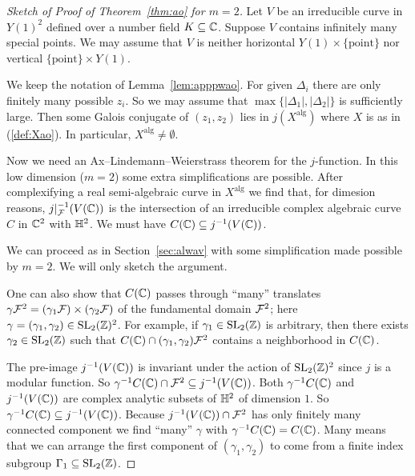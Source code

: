 \begin{proof}[Sketch of Proof of Theorem~\ref{thm:ao} for $m=2$]
  Let $V$ be an irreducible curve in $Y(1)^2$ defined over a number
  field $K\subseteq{\mathbb{C}}$. Suppose $V$ contains infinitely many special
  points.
  We may assume that $V$ is neither horizontal
  $Y(1)\times\{\text{point}\}$ nor vertical $\{\text{point}\}\times
  Y(1)$. 

  We keep the notation of Lemma~\ref{lem:apppwao}. For given
  $\Delta_i$ there are only finitely many possible $z_i$. So we may
  assume that $\max\{|\Delta_1|,|\Delta_2|\}$ is sufficiently large.
  Then some Galois conjugate of $(z_1,z_2)$ lies in
  $j(X^{\mathrm{alg}})$ where $X$ is as in (\ref{def:Xao}). In
  particular, $X^{\mathrm{alg}}\not=\emptyset$. 

  Now we need an Ax--Lindemann--Weierstrass theorem  for the
  $j$-function.
  In this low dimension ($m=2$) some extra simplifications are
  possible.
  After complexifying a real semi-algebraic curve in
  $X^{\mathrm{alg}}$ we find that, for dimesion reasons, 
  $j|_{{\mathcal F}}^{-1}(V({\mathbb{C}}))$ is the intersection of an irreducible
  complex algebraic
  curve $C$ in ${\mathbb{C}}^2$ with ${\mathbb{H}}^2$. We must have
  $C({\mathbb{C}}) \subseteq j^{-1}(V({\mathbb{C}}))$. 

  We can proceed as in Section~\ref{sec:alwav} with some
  simplification made possible by $m=2$. We will only sketch the argument.

  One can also show that $C({\mathbb{C}})$ passes through  ``many'' translates
  $\gamma{\mathcal F}^2 = (\gamma_1{\mathcal F})\times (\gamma_2{\mathcal F})$ of the  fundamental domain
  ${\mathcal F}^2$; here $\gamma=(\gamma_1,\gamma_2)\in \mathrm{SL}_2({\mathbb{Z}})^2$.
  For example, if $\gamma_1\in \mathrm{SL}_2({\mathbb{Z}})$ is arbitrary, then
  there exists $\gamma_2\in \mathrm{SL}_2({\mathbb{Z}})$ such that 
  $C({\mathbb{C}})\cap (\gamma_1,\gamma_2) {\mathcal F}^2$ contains a neighborhood in
  $C({\mathbb{C}})$. 
  
  The pre-image $j^{-1}(V({\mathbb{C}}))$ is invariant under the action of
  $\mathrm{SL}_2({\mathbb{Z}})^2$ since $j$ is a modular function. 
  So $\gamma^{-1}C({\mathbb{C}})\cap {\mathcal F}^2 \subseteq j^{-1}(V({\mathbb{C}}))$. Both
  $\gamma^{-1}C({\mathbb{C}})$ and $j^{-1}(V({\mathbb{C}}))$ are complex analytic
  subsets of ${\mathbb{H}}^2$ of dimension $1$. So $\gamma^{-1}C({\mathbb{C}}) \subseteq
  j^{-1}(V({\mathbb{C}}))$.  Because $j^{-1}(V({\mathbb{C}}))\cap{\mathcal F}^2$ has only finitely
  many connected component we find ``many'' $\gamma$ with
  $\gamma^{-1} C({\mathbb{C}}) = C({\mathbb{C}})$. Many means that we can arrange the
  first component of $(\gamma_1,\gamma_2)$ to come from a finite index
  subgroup $\Gamma_1\subseteq\mathrm{SL}_2({\mathbb{Z}})$.


\end{proof}
